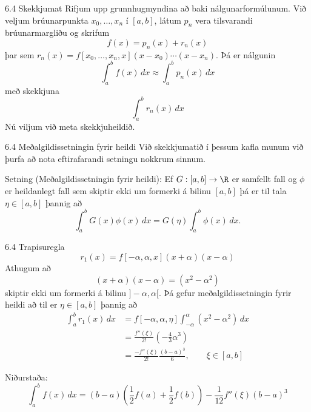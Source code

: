 \begin{frame}{6.4 Skekkjumat}
Rifjum upp grunnhugmyndina að baki nálgunarformúlunum. Við veljum
brúunarpunkta $x_0, \ldots, x_n$ í $[a,b]$, látum $p_n$ vera
tilsvarandi brúunarmargliðu og skrifum 
\begin{equation*}
  f(x) = p_n(x) + r_n(x)
\end{equation*}
\pause
þar sem $r_n(x) = f[x_0, \ldots , x_n, x](x-x_0) \cdots (x-x_n)$. Þá er nálgunin
\begin{equation*}
  \int_a^b f(x)\,dx \approx \int_a^b p_n(x)\,dx
\end{equation*}
\pause
með skekkjuna
\begin{equation*}
  \int_a^b r_n(x)\,dx
\end{equation*}
Nú viljum við meta skekkjuheildið.
\end{frame}

\begin{frame}{6.4 Meðalgildissetningin fyrir heildi}
 Við skekkjumatið í þessum kafla munum við þurfa að nota eftirafarandi 
 setningu nokkrum sinnum.
\begin{block}{Setning (Meðalgildissetningin fyrir heildi):}
 Ef $G:[a,b] \to \R$ er samfellt fall og $\phi$ er heildanlegt fall sem 
 skiptir ekki um formerki á bilinu $[a,b]$ þá er til tala $\eta \in [a,b]$
 þannig að 
 $$
  \int_a^b G(x)\phi(x)\, dx = G(\eta) \int_a^b \phi(x)\, dx.
 $$
\end{block}

\end{frame}


\begin{frame}{6.4 Trapisuregla} 
\begin{equation*}
  r_1(x) = f[-\alpha, \alpha, x](x+\alpha)(x-\alpha)
\end{equation*}
\pause
Athugum að 
\begin{equation*}
  (x+\alpha)(x-\alpha) = (x^2 - \alpha^2)
\end{equation*}
skiptir ekki um formerki á bilinu $]-\alpha, \alpha[$. \pause
Þá gefur meðalgildissetningin fyrir heildi að til 
er $\eta \in [a,b]$ þannig að\pause
\begin{align*}
  \int_a^b r_1(x)\,dx 
  &= f[-\alpha, \alpha, \eta]
  \int_{-\alpha}^{\alpha}(x^2 - \alpha^2)\,dx\\
  &= \frac{f''(\xi)}{2!} \left( - \frac{4}{3}\alpha^3 \right)\\
  &= \frac{-f''(\xi)}{2!}\frac{(b-a)^3}{6}, \qquad \xi \in [a,b]
\end{align*}

\pause
\smallskip
Niðurstaða:
\begin{equation*}
  \int_a^b f(x)\,dx = (b-a)
  \left( \frac{1}{2} f(a) + \frac{1}{2}f(b) \right) 
  - \frac{1}{12} f''(\xi)(b-a)^3
\end{equation*}
\end{frame}


